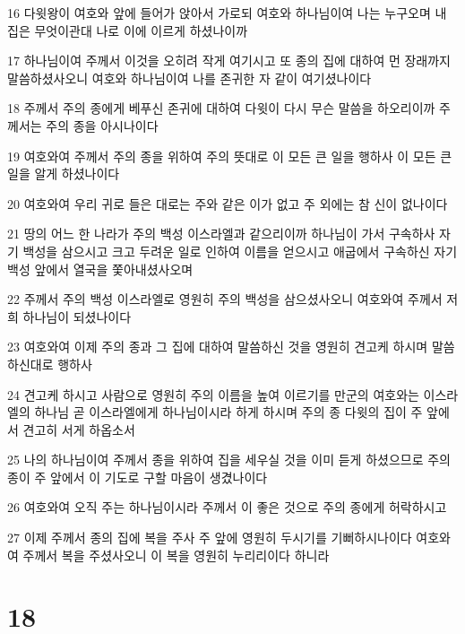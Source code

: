 \par 16 다윗왕이 여호와 앞에 들어가 앉아서 가로되 여호와 하나님이여 나는 누구오며 내 집은 무엇이관대 나로 이에 이르게 하셨나이까
\par 17 하나님이여 주께서 이것을 오히려 작게 여기시고 또 종의 집에 대하여 먼 장래까지 말씀하셨사오니 여호와 하나님이여 나를 존귀한 자 같이 여기셨나이다
\par 18 주께서 주의 종에게 베푸신 존귀에 대하여 다윗이 다시 무슨 말씀을 하오리이까 주께서는 주의 종을 아시나이다
\par 19 여호와여 주께서 주의 종을 위하여 주의 뜻대로 이 모든 큰 일을 행하사 이 모든 큰 일을 알게 하셨나이다
\par 20 여호와여 우리 귀로 들은 대로는 주와 같은 이가 없고 주 외에는 참 신이 없나이다
\par 21 땅의 어느 한 나라가 주의 백성 이스라엘과 같으리이까 하나님이 가서 구속하사 자기 백성을 삼으시고 크고 두려운 일로 인하여 이름을 얻으시고 애굽에서 구속하신 자기 백성 앞에서 열국을 쫓아내셨사오며
\par 22 주께서 주의 백성 이스라엘로 영원히 주의 백성을 삼으셨사오니 여호와여 주께서 저희 하나님이 되셨나이다
\par 23 여호와여 이제 주의 종과 그 집에 대하여 말씀하신 것을 영원히 견고케 하시며 말씀하신대로 행하사
\par 24 견고케 하시고 사람으로 영원히 주의 이름을 높여 이르기를 만군의 여호와는 이스라엘의 하나님 곧 이스라엘에게 하나님이시라 하게 하시며 주의 종 다윗의 집이 주 앞에서 견고히 서게 하옵소서
\par 25 나의 하나님이여 주께서 종을 위하여 집을 세우실 것을 이미 듣게 하셨으므로 주의 종이 주 앞에서 이 기도로 구할 마음이 생겼나이다
\par 26 여호와여 오직 주는 하나님이시라 주께서 이 좋은 것으로 주의 종에게 허락하시고
\par 27 이제 주께서 종의 집에 복을 주사 주 앞에 영원히 두시기를 기뻐하시나이다 여호와여 주께서 복을 주셨사오니 이 복을 영원히 누리리이다 하니라

\chapter{18}

